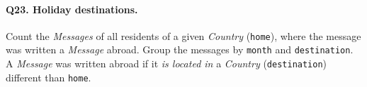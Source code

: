 \paragraph{\textbf{Q23}. Holiday destinations.}
Count the \emph{Messages} of all residents of a given \emph{Country}
(\texttt{home}), where the message was written a \emph{Message} abroad.
Group the messages by \texttt{month} and \texttt{destination}.
A \emph{Message} was written abroad if it \emph{is located in} a
\emph{Country} (\texttt{destination}) different than \texttt{home}.
